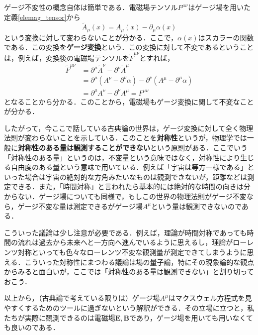 \documentclass[a4paper,pdflatex,ja=standard]{bxjsarticle}
\begin{document}
ゲージ不変性の概念自体は簡単である．電磁場テンソル$F^{\mu\nu}$はゲージ場を用いた定義\eqref{elemag_tensor}から
\begin{equation}
  \tilde{A}_{\mu}(x)
  =
  A_{\mu}(x)
  -
  \partial_{\mu}\alpha(x)
\end{equation}
という変換に対して変わらないことが分かる．ここで，$\alpha(x)$はスカラーの関数である．この変換を\textbf{ゲージ変換}という．この変換に対して不変であるということは，例えば，変換後の電磁場テンソルを$\tilde{F}^{\mu\nu}$とすれば，
\begin{align}
  \tilde{F}^{\mu\nu}
  &=
  \partial^{\mu}\tilde{A}^{\nu}
  -
  \partial^{\nu}\tilde{A}^{\mu}
  \nonumber
  \\
  &=
  \partial^{\mu}(A^{\nu}-\partial^{\nu}\alpha)
  -
  \partial^{\nu}(A^{\mu}-\partial^{\mu}\alpha)
  \nonumber
  \\
  &=
  \partial^{\mu}A^{\nu}
  -
  \partial^{\nu}A^{\mu}
  =
  F^{\mu\nu}
\end{align}
となることから分かる．このことから，電磁場もゲージ変換に関して不変なことが分かる．

したがって，今ここで話している古典論の世界は，ゲージ変換に対して全く物理法則が変わらないことを示している．このことを\textbf{対称性}というが，物理学では一般に\textbf{対称性のある量は観測することができない}という原則がある．ここでいう「対称性のある量」というのは，不変量という意味ではなく，対称性により生じる自由度のある量という意味で用いている．例えば「宇宙は等方一様である」といった場合は宇宙の絶対的な方角みたいなものは観測できないが，距離などは測定できる．また，「時間対称」と言われたら基本的には絶対的な時間の向きは分からない．ゲージ場についても同様で，もしこの世界の物理法則がゲージ不変なら，ゲージ不変な量は測定できるがゲージ場$A^{\mu}$という量は観測できないのである．

\vspace{10pt}
{\small
  こういった議論は少し注意が必要である．例えば，理論が時間対称であっても時間の流れは過去から未来へと一方向へ進んでいるように思えるし，理論がローレンツ対称といっても色々なローレンツ不変な観測量が測定できてしまうように思える．こういった対称性にまつわる議論は場の量子論，特にその現象論的な観点からみると面白いが，ここでは「対称性のある量は観測できない」と割り切っておこう．
}
\vspace{10pt}

以上から，（古典論で考えている限りは）ゲージ場$A^{\mu}$はマクスウェル方程式を見やすくするためのツールに過ぎないという解釈ができる．その立場に立つと，私たちが実際に観測できるのは電磁場$\bm{E},\bm{B}$であり，ゲージ場を用いても用いなくても良いのである．
\end{document}
